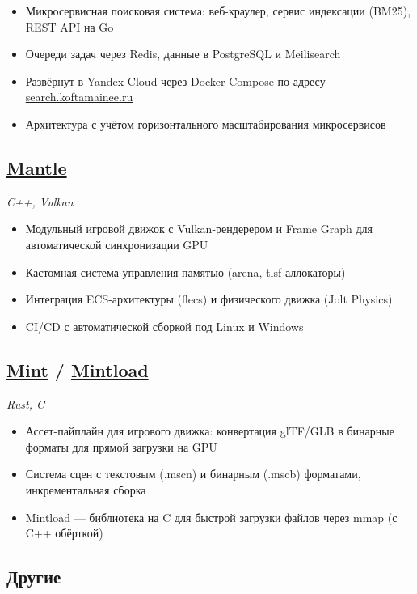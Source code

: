 \documentclass[a4paper,11pt]{article}
\begin{document}
\begin{itemize}
  \item Микросервисная поисковая система: веб-краулер, сервис индексации (BM25), REST API на Go
  \item Очереди задач через Redis, данные в PostgreSQL и Meilisearch
  \item Развёрнут в Yandex Cloud через Docker Compose по адресу \href{https://search.koftamainee.ru}{search.koftamainee.ru}
  \item Архитектура с учётом горизонтального масштабирования микросервисов
\end{itemize}

\subsection*{\href{https://github.com/koftamainee/mantle}{Mantle}}
\hfill \textit{C++, Vulkan}

\begin{itemize}
  \item Модульный игровой движок с Vulkan-рендерером и Frame Graph для автоматической синхронизации GPU
  \item Кастомная система управления памятью (arena, tlsf аллокаторы)
  \item Интеграция ECS-архитектуры (flecs) и физического движка (Jolt Physics)
  \item CI/CD с автоматической сборкой под Linux и Windows
\end{itemize}

\subsection*{\href{https://github.com/koftamainee/mint}{Mint} / \href{https://github.com/koftamainee/mintload}{Mintload}}
\hfill \textit{Rust, C}

\begin{itemize}
  \item Ассет-пайплайн для игрового движка: конвертация glTF/GLB в бинарные форматы для прямой загрузки на GPU
  \item Система сцен с текстовым (.mscn) и бинарным (.mscb) форматами, инкрементальная сборка
  \item Mintload --- библиотека на C для быстрой загрузки файлов через mmap (с C++ обёрткой)
\end{itemize}

\subsection*{Другие}
\end{document}
